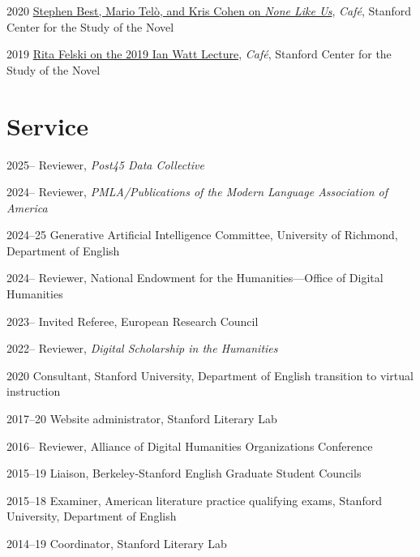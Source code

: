 \documentclass[12pt,letterpaper]{report}
\begin{document}
\begin{tablist}
	\item[2020] \tab{}\href{https://web.archive.org/web/20220429093211/https://novel.stanford.edu/csn-cafe/2021/7/23/books-at-the-center-stephen-best-mario-tel-and-kris-cohen-on-none-like-us-101019}{Stephen Best, Mario Telò, and Kris Cohen on \emph{None Like Us}}, \emph{Café}, Stanford Center for the Study of the Novel
	\item[2019] \tab{}\href{https://web.archive.org/web/20220429093144/https://novel.stanford.edu/csn-cafe/2021/7/23/rita-felski-on-her-2019-ian-watt-lecture-5319}{Rita Felski on the 2019 Ian Watt Lecture}, \emph{Café}, Stanford Center for the Study of the Novel
\end{tablist}

\section*{Service}

\begin{tablist}
	\item[2025--] \tab{}Reviewer, \emph{Post45 Data Collective}
	\item[2024--] \tab{}Reviewer, \emph{PMLA/Publications of the Modern Language Association of America}
	\item[2024--25] \tab{}Generative Artificial Intelligence Committee, University of Richmond, Department of English
	\item[2024--] \tab{}Reviewer, National Endowment for the Humanities—Office of Digital Humanities
	\item[2023--] \tab{}Invited Referee, European Research Council
	\item[2022--] \tab{}Reviewer, \textit{Digital Scholarship in the Humanities}
	\item[2020] \tab{}Consultant, Stanford University, Department of English transition to virtual instruction
	\item[2017--20] \tab{}Website administrator, Stanford Literary Lab
	\item[2016--] \tab{}Reviewer, Alliance of Digital Humanities Organizations Conference
	\item[2015--19] \tab{}Liaison, Berkeley-Stanford English Graduate Student Councils
	\item[2015--18] \tab{}Examiner, American literature practice qualifying exams, Stanford University, Department of English
	\item[2014--19] \tab{}Coordinator, Stanford Literary Lab
\end{tablist}
\end{document}
